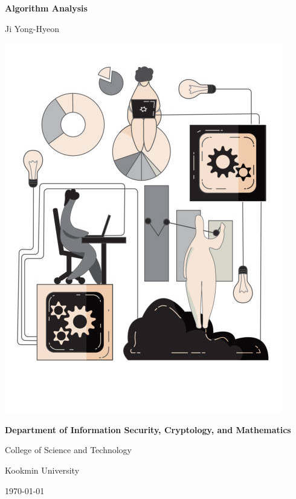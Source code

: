 \documentclass[12pt,openany]{book}
\theoremstyle{definition}
\begin{document}
	
	\begin{titlepage}
		\begin{center}
			{\Huge\textsf{\textbf{Algorithm Analysis}}\par}
			\vspace{0.5in}
			{\Large Ji Yong-Hyeon\par}
			\vspace{1in}
			\includegraphics[scale=2.5]{aa2.jpg}\par
			\vspace{1in}\large
			{\bf Department of Information Security, Cryptology, and Mathematics\par}
			{College of Science and Technology\par}
			{Kookmin University\par}
			\vspace{.25in}
			{\large \today\par}
		\end{center}
	\end{titlepage}
	
\end{document}
